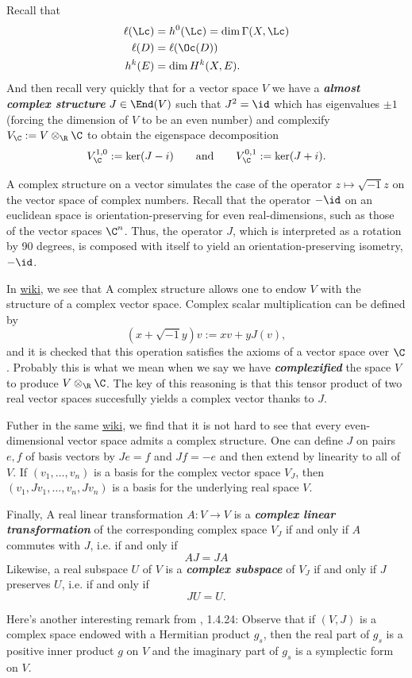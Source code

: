 Recall that
\begin{align*}
	\ell(\Lc)&=h^0(\Lc)=\dim\Gamma(X,\Lc)\\
	\ell(D)&=\ell(\Oc(D))\\
	h^k(E)&=\dim H^k(X,E).
\end{align*}
And then recall very quickly that for a vector space $V$ we have a \textbf{\textit{almost complex structure}} $J\in\End(V)$ such that $J^2=\id$ which has eigenvalues $\pm1$ (forcing the dimension of $V$ to be an even number) and complexify $V_\C:=V\otimes_\R\C$ to obtain the eigenspace decomposition
\[V^{1,0}_{\C}:=\ker(J-i)\qquad\text{and}\qquad V^{0,1}_{\C}:=\ker(J+i).\]
\begin{remark}
	A complex structure on a vector simulates the case of the operator $z\mapsto \sqrt{-1}z$ on the vector space of complex numbers. Recall that the operator $-\id$ on an euclidean space is orientation-preserving for even real-dimensions, such as those of the vector spaces $\C^n$. Thus, the operator $J$, which is interpreted as a rotation by 90 degrees, is composed with itself to yield an orientation-preserving isometry, $-\id$.
	
	In \href{https://en.wikipedia.org/wiki/Linear_complex_structure#Definition_and_properties}{wiki}, we see that A complex structure allows one to endow $V$ with the structure of a complex vector space. Complex scalar multiplication can be defined by
	\[(x+\sqrt{-1}y)v:=xv+yJ(v),\]
	and it is checked that this operation satisfies the axioms of a vector space over $\C$. {\color{cyan}Probably this is what we mean when we say we have \textbf{\textit{complexified}} the space $V$ to produce $V\otimes_\R\C$. The key of this reasoning is that this tensor product of two real vector spaces succesfully yields a complex vector thanks to $J$.}
	
	Futher in the same \href{https://en.wikipedia.org/wiki/Linear_complex_structure#Definition_and_properties}{wiki}, we find that it is not hard to see that every even-dimensional vector space admits a complex structure. One can define $J$ on pairs $e,f$ of basis vectors by $Je = f$ and $Jf = -e$ and then extend by linearity to all of $V$. If $(v_1, \ldots, v_n)$ is a basis for the complex vector space $V_J$, then $(v_1,Jv_1,\ldots,v_n,Jv_n)$ is a basis for the underlying real space $V$.
	
	Finally, A real linear transformation $A : V \to V$ is a \textbf{\textit{complex linear transformation}} of the corresponding complex space $V_J$ if and only if $A$ commutes with $J$, i.e. if and only if
	\[AJ=JA\]
	Likewise, a real subspace $U$ of $V$ is a \textbf{\textit{complex subspace}} of $V_J$ if and only if $J$ preserves $U$, i.e. if and only if
	\[JU=U.\]
\end{remark}
\begin{remark}
	Here's another interesting remark from \cite{piccione}, 1.4.24: Observe that if $(V,J)$ is a complex space endowed with a Hermitian product $g_s$, then the real part of $g_s$ is a positive inner product $g$ on $V$ and the imaginary part of $g_s$ is a symplectic form on $V$. 
\end{remark}

